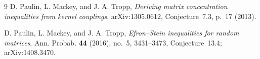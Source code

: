 \documentclass[10pt]{article}
\begin{document}
\begin{thebibliography}{9}
D. Paulin, L. Mackey, and J. A. Tropp,
\emph{Deriving matrix concentration inequalities from kernel couplings},
arXiv:1305.0612, Conjecture~7.3, p.~17 (2013).

D. Paulin, L. Mackey, and J. A. Tropp,
\emph{Efron--Stein inequalities for random matrices},
Ann. Probab. \textbf{44} (2016), no.~5, 3431--3473,
Conjecture~13.4; arXiv:1408.3470.
\end{thebibliography}
\end{document}
